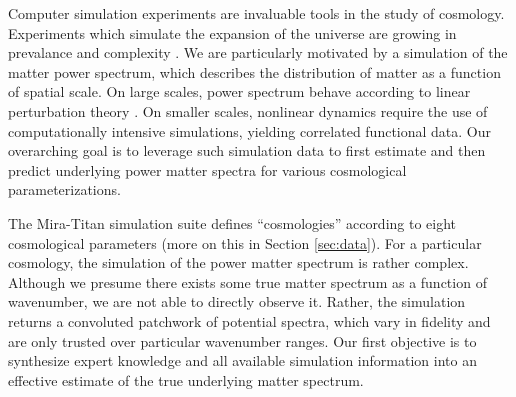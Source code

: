 \documentclass[11pt]{article}
\begin{document}
Computer simulation experiments are invaluable tools in the study of cosmology.
Experiments which simulate the expansion of the universe are growing
in prevalance and complexity \citep[e.g.,][]{lawrence2010coyote,derose2019aemulus,
nishimichi2019dark,angulo2021bacco,euclid2021euclid,moran2023mira}.  
We are particularly motivated by a simulation
of the matter power spectrum, which describes the distribution of matter as a 
function of spatial scale. 
On large scales, power spectrum behave according to linear perturbation 
theory \citep{pietroni2008flowing, lesgourgues2009non}.  On smaller scales, nonlinear 
dynamics require the use of computationally intensive simulations, yielding
correlated functional data.
Our overarching goal is to leverage such simulation data to 
first estimate and then predict underlying power matter spectra for various 
cosmological parameterizations.

The Mira-Titan simulation suite \citep{moran2023mira}
defines ``cosmologies'' according to eight cosmological parameters (more on this
in Section \ref{sec:data}).  For a particular cosmology, the simulation of the power matter spectrum 
is rather complex.  Although we presume there exists some true matter spectrum as a function
of wavenumber, we are not able to directly observe it.  Rather, the simulation returns
a convoluted patchwork of potential spectra, which vary in fidelity and are only trusted
over particular wavenumber ranges.  Our first objective is to synthesize expert knowledge
and all available simulation information into an effective estimate of the true underlying
matter spectrum.  
\end{document}
